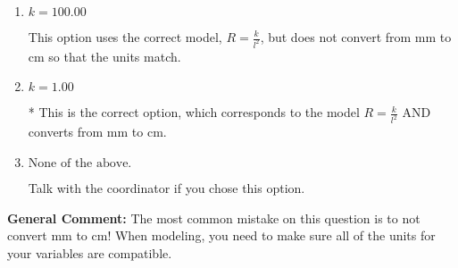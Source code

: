 \documentclass{extbook}[14pt]
\begin{document}
\begin{enumerate}
{\begin{enumerate}[label=\Alph*.]
This option uses the model $R = kl^{2}$ as if this is a direct variation AND does not convert from mm to cm so that the units match.
\item \( k = 100.00 \)

This option uses the correct model, $R = \frac{k}{l^{2}}$, but does not convert from mm to cm so that the units match.
\item \( k = 1.00 \)

* This is the correct option, which corresponds to the model $R = \frac{k}{l^{2}}$ AND converts from mm to cm.
\item \( \text{None of the above.} \)

Talk with the coordinator if you chose this option.
\end{enumerate}

\textbf{General Comment:} The most common mistake on this question is to not convert mm to cm! When modeling, you need to make sure all of the units for your variables are compatible.
}
\end{enumerate}
\end{document}
